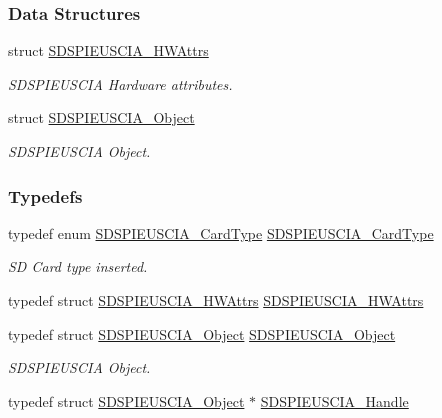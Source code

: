 \subsubsection*{Data Structures}
\begin{DoxyCompactItemize}
\item 
struct \hyperlink{struct_s_d_s_p_i_e_u_s_c_i_a___h_w_attrs}{S\+D\+S\+P\+I\+E\+U\+S\+C\+I\+A\+\_\+\+H\+W\+Attrs}
\begin{DoxyCompactList}\small\item\em S\+D\+S\+P\+I\+E\+U\+S\+C\+I\+A Hardware attributes. \end{DoxyCompactList}\item 
struct \hyperlink{struct_s_d_s_p_i_e_u_s_c_i_a___object}{S\+D\+S\+P\+I\+E\+U\+S\+C\+I\+A\+\_\+\+Object}
\begin{DoxyCompactList}\small\item\em S\+D\+S\+P\+I\+E\+U\+S\+C\+I\+A Object. \end{DoxyCompactList}\end{DoxyCompactItemize}
\subsubsection*{Typedefs}
\begin{DoxyCompactItemize}
\item 
typedef enum \hyperlink{_s_d_s_p_i_e_u_s_c_i_a_8h_aaf384a8a07d5fb92b9ba72250174d577}{S\+D\+S\+P\+I\+E\+U\+S\+C\+I\+A\+\_\+\+Card\+Type} \hyperlink{_s_d_s_p_i_e_u_s_c_i_a_8h_a362d5b7bf44624901c58b48939699cd4}{S\+D\+S\+P\+I\+E\+U\+S\+C\+I\+A\+\_\+\+Card\+Type}
\begin{DoxyCompactList}\small\item\em S\+D Card type inserted. \end{DoxyCompactList}\item 
typedef struct \hyperlink{struct_s_d_s_p_i_e_u_s_c_i_a___h_w_attrs}{S\+D\+S\+P\+I\+E\+U\+S\+C\+I\+A\+\_\+\+H\+W\+Attrs} \hyperlink{_s_d_s_p_i_e_u_s_c_i_a_8h_a5648f15a35bdad301d31c6874b20ebc5}{S\+D\+S\+P\+I\+E\+U\+S\+C\+I\+A\+\_\+\+H\+W\+Attrs}
\item 
typedef struct \hyperlink{struct_s_d_s_p_i_e_u_s_c_i_a___object}{S\+D\+S\+P\+I\+E\+U\+S\+C\+I\+A\+\_\+\+Object} \hyperlink{_s_d_s_p_i_e_u_s_c_i_a_8h_ab597a53cdfa290295a3d4cf1b0a1f4f0}{S\+D\+S\+P\+I\+E\+U\+S\+C\+I\+A\+\_\+\+Object}
\begin{DoxyCompactList}\small\item\em S\+D\+S\+P\+I\+E\+U\+S\+C\+I\+A Object. \end{DoxyCompactList}\item 
typedef struct \hyperlink{struct_s_d_s_p_i_e_u_s_c_i_a___object}{S\+D\+S\+P\+I\+E\+U\+S\+C\+I\+A\+\_\+\+Object} $\ast$ \hyperlink{_s_d_s_p_i_e_u_s_c_i_a_8h_a70683fd7da45849d86266f7af970e6c8}{S\+D\+S\+P\+I\+E\+U\+S\+C\+I\+A\+\_\+\+Handle}
\end{DoxyCompactItemize}
